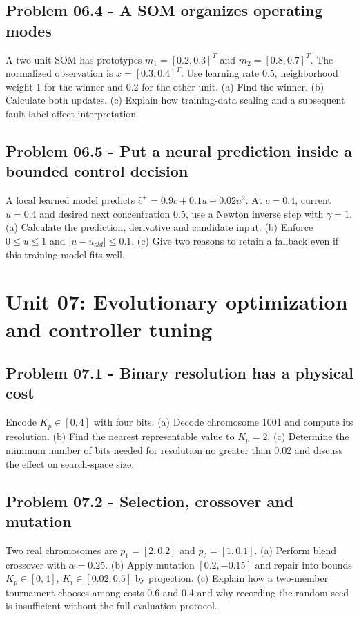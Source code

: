 \documentclass[11pt,a4paper]{article}
\begin{document}
\subsection{Problem 06.4 - A SOM organizes operating modes}
A two-unit SOM has prototypes $m_1=[0.2,0.3]^T$ and $m_2=[0.8,0.7]^T$. The normalized observation is $x=[0.3,0.4]^T$. Use learning rate 0.5, neighborhood weight 1 for the winner and 0.2 for the other unit. (a) Find the winner. (b) Calculate both updates. (c) Explain how training-data scaling and a subsequent fault label affect interpretation.

\subsection{Problem 06.5 - Put a neural prediction inside a bounded control decision}
A local learned model predicts $\hat c^+=0.9c+0.1u+0.02u^2$. At $c=0.4$, current $u=0.4$ and desired next concentration 0.5, use a Newton inverse step with $\gamma=1$. (a) Calculate the prediction, derivative and candidate input. (b) Enforce $0\leq u\leq1$ and $|u-u_{old}|\leq0.1$. (c) Give two reasons to retain a fallback even if this training model fits well.


\clearpage\section{Unit 07: Evolutionary optimization and controller tuning}
\subsection{Problem 07.1 - Binary resolution has a physical cost}
Encode $K_p\in[0,4]$ with four bits. (a) Decode chromosome 1001 and compute its resolution. (b) Find the nearest representable value to $K_p=2$. (c) Determine the minimum number of bits needed for resolution no greater than 0.02 and discuss the effect on search-space size.

\subsection{Problem 07.2 - Selection, crossover and mutation}
Two real chromosomes are $p_1=[2,0.2]$ and $p_2=[1,0.1]$. (a) Perform blend crossover with $\alpha=0.25$. (b) Apply mutation $[0.2,-0.15]$ and repair into bounds $K_p\in[0,4]$, $K_i\in[0.02,0.5]$ by projection. (c) Explain how a two-member tournament chooses among costs 0.6 and 0.4 and why recording the random seed is insufficient without the full evaluation protocol.
\end{document}
